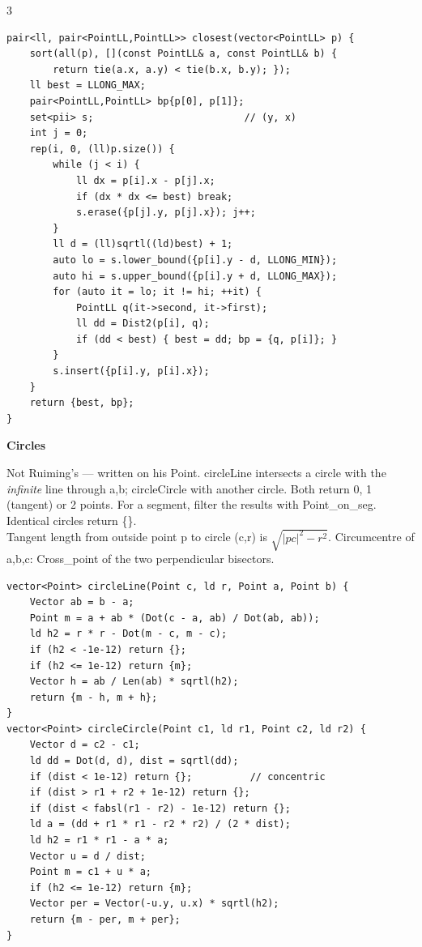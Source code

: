 \documentclass[9pt,a4paper]{extarticle}
\newcommand{\entry}[3]{%
  \addcontentsline{toc}{subsection}{#1}%
  \vspace{0.8ex}%
  \noindent\colorbox{hdbg}{\parbox{\dimexpr\columnwidth-2\fboxsep}{%
    \strut\textbf{#1}\hfill{\footnotesize\textsf{#2}}}}\par
  \vspace{0.4ex}%
  {\footnotesize #3\par}%
}
\newcommand{\code}[1]{{\ttfamily\small #1}}
\begin{document}
\begin{multicols*}{3}
\begin{lstlisting}
pair<ll, pair<PointLL,PointLL>> closest(vector<PointLL> p) {
    sort(all(p), [](const PointLL& a, const PointLL& b) {
        return tie(a.x, a.y) < tie(b.x, b.y); });
    ll best = LLONG_MAX;
    pair<PointLL,PointLL> bp{p[0], p[1]};
    set<pii> s;                          // (y, x)
    int j = 0;
    rep(i, 0, (ll)p.size()) {
        while (j < i) {
            ll dx = p[i].x - p[j].x;
            if (dx * dx <= best) break;
            s.erase({p[j].y, p[j].x}); j++;
        }
        ll d = (ll)sqrtl((ld)best) + 1;
        auto lo = s.lower_bound({p[i].y - d, LLONG_MIN});
        auto hi = s.upper_bound({p[i].y + d, LLONG_MAX});
        for (auto it = lo; it != hi; ++it) {
            PointLL q(it->second, it->first);
            ll dd = Dist2(p[i], q);
            if (dd < best) { best = dd; bp = {q, p[i]}; }
        }
        s.insert({p[i].y, p[i].x});
    }
    return {best, bp};
}
\end{lstlisting}

\entry{Circles}{}{%
Not Ruiming's --- written on his \code{Point}. \code{circleLine} intersects a circle
with the \emph{infinite} line through \code{a,b}; \code{circleCircle} with another
circle. Both return 0, 1 (tangent) or 2 points. For a segment, filter the results with
\code{Point\_on\_seg}. Identical circles return \code{\{\}}.\\[0.3ex]
Tangent length from outside point \code{p} to circle \code{(c,r)} is
$\sqrt{|pc|^2 - r^2}$. Circumcentre of \code{a,b,c}: \code{Cross\_point} of the two
perpendicular bisectors.}

\begin{lstlisting}
vector<Point> circleLine(Point c, ld r, Point a, Point b) {
    Vector ab = b - a;
    Point m = a + ab * (Dot(c - a, ab) / Dot(ab, ab));
    ld h2 = r * r - Dot(m - c, m - c);
    if (h2 < -1e-12) return {};
    if (h2 <= 1e-12) return {m};
    Vector h = ab / Len(ab) * sqrtl(h2);
    return {m - h, m + h};
}
vector<Point> circleCircle(Point c1, ld r1, Point c2, ld r2) {
    Vector d = c2 - c1;
    ld dd = Dot(d, d), dist = sqrtl(dd);
    if (dist < 1e-12) return {};          // concentric
    if (dist > r1 + r2 + 1e-12) return {};
    if (dist < fabsl(r1 - r2) - 1e-12) return {};
    ld a = (dd + r1 * r1 - r2 * r2) / (2 * dist);
    ld h2 = r1 * r1 - a * a;
    Vector u = d / dist;
    Point m = c1 + u * a;
    if (h2 <= 1e-12) return {m};
    Vector per = Vector(-u.y, u.x) * sqrtl(h2);
    return {m - per, m + per};
}
\end{lstlisting}


\end{multicols*}
\end{document}
